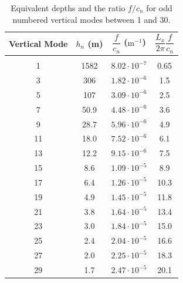\begin{table}
\begin{center}
\begin{tabular}{c c c c}

\hline
Vertical Mode & $h_n$ (m) & $\dfrac{f}{c_n}$ ($\mathrm{m}^{-1}$) & $\dfrac{L_x}{2\pi} \dfrac{f}{c_n}$\\
\hline\\
1 & 1582 & $8.02\cdot 10^{-7}$ & 0.65\\
3 & 306 & $1.82\cdot 10^{-6}$ & 1.5\\
5 & 107 & $3.09\cdot 10^{-6}$ &  2.5\\
7 & 50.9 & $4.48\cdot 10^{-6}$ & 3.6 \\
9 & 28.7 & $5.96\cdot 10^{-6}$ & 4.9 \\
11 & 18.0 & $7.52\cdot 10^{-6}$ & 6.1 \\
13 & 12.2 & $9.15\cdot 10^{-6}$ & 7.5\\
15 & 8.6 & $1.09\cdot 10^{-5}$ & 8.9\\
17 & 6.4 & $1.26\cdot 10^{-5}$ & 10.3\\
19 & 4.9 & $1.45\cdot 10^{-5}$ & 11.8\\
21 & 3.8 & $1.64\cdot 10^{-5}$ & 13.4\\
23 & 3.0 & $1.84\cdot 10^{-5}$ & 15.0\\
25 & 2.4 & $2.04\cdot 10^{-5}$ & 16.6\\
27 & 2.0 & $2.25\cdot 10^{-5}$ & 18.3\\
29 & 1.7 & $2.47\cdot 10^{-5}$ & 20.1\\
\hline
\end{tabular}
\end{center}
\caption{Equivalent depths and the ratio $f/c_n$ for odd numbered vertical modes between 1 and 30.}
\label{tab:equivDepths}
\end{table} 
